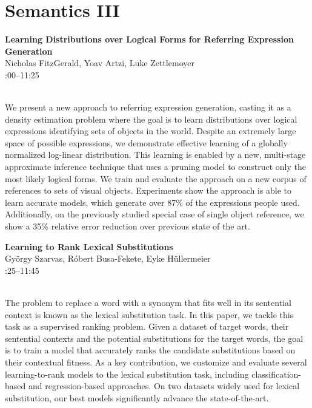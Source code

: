 \documentclass[twoside,makeidx]{book}
\renewcommand{\normalsize}{\fontsize{8}{9}\selectfont}
\renewcommand{\small}{\fontsize{7}{8}\selectfont}
\begin{document}
\section{Semantics III}
\vspace{-1em}
\par\vspace{2em}\noindent%
\begin{minipage}{\linewidth}%
\begin{center}
\textbf{\normalsize Learning Distributions over Logical Forms for Referring Expression Generation}\\
\normalsize  Nicholas FitzGerald,  Yoav Artzi,  Luke Zettlemoyer\\
{\small 11:00--11:25}\\
\end{center}
\end{minipage}\\[0.5em]
\nopagebreak%
\noindent%
{\small We present a new approach to referring expression generation, casting it as a density estimation problem where the goal is to learn distributions over logical expressions identifying sets of objects in the world. Despite an extremely large space of possible expressions, we demonstrate effective learning of a globally normalized log-linear distribution. This learning is enabled by a new, multi-stage approximate inference technique that uses a pruning model to construct only the most likely logical forms. We train and evaluate the approach on a new corpus of references to sets of visual objects. Experiments show the approach is able to learn accurate models, which generate over 87\% of the expressions people used. Additionally, on the previously studied special case of single object reference, we show a 35\% relative error reduction over previous state of the art.}
\par\vspace{2em}\noindent%
\begin{minipage}{\linewidth}%
\begin{center}
\textbf{\normalsize Learning to Rank Lexical Substitutions}\\
\normalsize  Gy\"{o}rgy Szarvas,  R\'{o}bert Busa-Fekete,  Eyke H\"{u}llermeier\\
{\small 11:25--11:45}\\
\end{center}
\end{minipage}\\[0.5em]
\nopagebreak%
\noindent%
{\small The problem to replace a word with a synonym that fits well in its sentential context is known as the lexical substitution task. In this paper, we tackle this task as a supervised ranking problem. Given a dataset of target words, their sentential contexts and the potential substitutions for the target words, the goal is to train a model that accurately ranks the candidate substitutions based on their contextual fitness. As a key contribution, we customize and evaluate several learning-to-rank models to the lexical substitution task, including classification-based and regression-based approaches. On two datasets widely used for lexical substitution, our best models significantly advance the state-of-the-art.}
\clearpage
\end{document}
